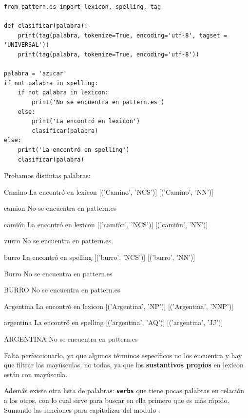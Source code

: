 \begin{verbatim}
from pattern.es import lexicon, spelling, tag

def clasificar(palabra):
	print(tag(palabra, tokenize=True, encoding='utf-8', tagset = 'UNIVERSAL'))
	print(tag(palabra, tokenize=True, encoding='utf-8'))

palabra = 'azucar'
if not palabra in spelling:
	if not palabra in lexicon:
		print('No se encuentra en pattern.es')
	else:
		print('La encontró en lexicon')
		clasificar(palabra)
else:
	print('La encontró en spelling')
	clasificar(palabra)
\end{verbatim}
Probamos distintas palabras:
\begin{cverbatim}
Camino
La encontró en lexicon
[('Camino', 'NCS')]
[('Camino', 'NN')]

camion
No se encuentra en pattern.es

camión
La encontró en lexicon
[('camión', 'NCS')]
[('camión', 'NN')]

vurro
No se encuentra en pattern.es

burro
La encontró en spelling
[('burro', 'NCS')]
[('burro', 'NN')]

Burro
No se encuentra en pattern.es

BURRO
No se encuentra en pattern.es

Argentina
La encontró en lexicon
[('Argentina', 'NP')]
[('Argentina', 'NNP')]

argentina
La encontró en spelling
[('argentina', 'AQ')]
[('argentina', 'JJ')]

ARGENTINA
No se encuentra en pattern.es
\end{cverbatim}

Falta perfeccionarlo, ya que algunos términos específicos no los encuentra y hay que filtrar las mayúsculas, no todas, ya que los \textbf{sustantivos propios} en lexicon están con mayúscula.

Además existe otra lista de palabras: \textbf{\texttt{verbs}} que tiene pocas palabras en relación a los otros, con lo cual sirve para buscar en ella primero que es más rápido. Sumando las funciones para capitalizar del modulo :


